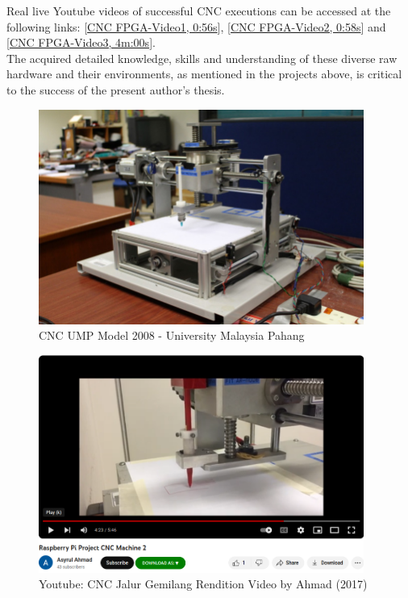 Real live Youtube videos of successful CNC executions can be accessed at the following links:  
[\href{https://www.youtube.com/watch?v=3GuhE5dlcYk}{CNC FPGA-Video1, 0:56s}], 
[\href{https://www.youtube.com/watch?v=VvAyLqt\_wLQ}{CNC FPGA-Video2, 0:58s}] and 
[\href{https://www.youtube.com/watch?v=gvlKlqfEXro}{CNC FPGA-Video3, 4m:00s}]. \\

The acquired detailed knowledge, skills and understanding of these diverse raw hardware and their environments, as mentioned in the projects above, is critical to the success of the present author's thesis.\\ 

\clearpage
\pagebreak

\begin{figure}
	\caption{ CNC UMP Model 2008 - University Malaysia Pahang}
    \label{chap2-CNC-Research-Machine-3-Axis.jpg}
	\centering
	\includegraphics[width=0.95\textwidth]{Images/Chap4/CNC/CNC-Research-Machine-3-Axis.jpg} 
\end{figure}


\begin{figure}
	\caption{Youtube: CNC Jalur Gemilang Rendition Video by Ahmad (2017)}
	\label{chap2-CNC-Jalur-Gemilang-Rendition-Video.png}
	\centering
	\includegraphics[width=0.95\textwidth]{Images/Chap3/CNC-Jalur-Gemilang-Rendition-Video.png} 
\end{figure}

